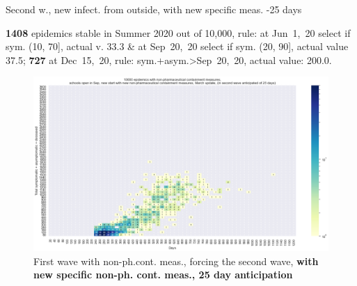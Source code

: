 \documentclass[8pt]{beamer}
\begin{document}
\begin{frame}{Second w., new infect. from outside, with new specific meas. -25 days}


\textbf{1408} {\tiny epidemics stable in Summer 2020 out of 10,000, rule: at Jun~1,~20 select if sym. (10, 70], actual v. 33.3 \& at Sep~20,~20 select if sym. (20, 90], actual value 37.5;} \textbf{727} {\tiny at Dec~15,~20, rule: sym.+asym.>Sep~20,~20, actual value: 200.0.}

\begin{figure}[H]
\center
\includegraphics[scale=0.17]{10kForceWave2Contr2M-25.png}
\caption{First wave with non-ph.cont. meas., forcing the second wave, \textbf{with new specific non-ph. cont. meas., 25 day anticipation}}
\label{selForceWave2Contr2M-25}
\end{figure}



\end{frame}
\end{document}
